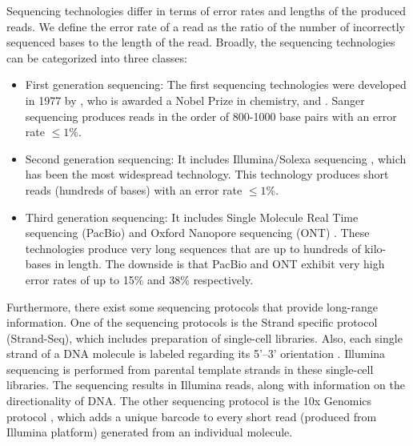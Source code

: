 Sequencing technologies differ in terms of error rates and lengths of the produced reads. We define the error rate of a read as the ratio of the number of incorrectly sequenced bases to the length of the read.
Broadly, the sequencing technologies can be categorized into three classes:
\begin{itemize}
\item First generation sequencing: The first sequencing technologies were developed in 1977 by \cite{sanger1977dna}, who is awarded a Nobel Prize in chemistry, and \cite{maxam1977new}.
Sanger sequencing produces reads in the order of 800-1000 base pairs with an error rate $\le 1$\%.
 \item Second generation sequencing: It includes Illumina/Solexa sequencing \citep{bentley2008accurate}, which has been the most widespread technology. 
 This technology produces short reads (hundreds of bases) with an error rate $\le 1$\%. 
  \item Third generation sequencing: It includes Single Molecule Real Time sequencing (PacBio) \citep{eid2009real} 
  and Oxford Nanopore sequencing (ONT) \citep{laszlo2014decoding}. These technologies produce very long sequences that are up to hundreds of kilo-bases in length. 
  The downside is that PacBio and ONT exhibit very high error rates of up to 15\% and 38\% respectively. 
\end{itemize}

Furthermore, there exist some sequencing protocols that provide long-range information.
One of the sequencing protocols is the Strand specific protocol (Strand-Seq), which includes preparation of single-cell libraries. 
Also, each single strand of a DNA molecule is labeled regarding its 5'–3' orientation \citep{falconer2012dna}.
Illumina sequencing is performed from parental template strands in these single-cell libraries.
The sequencing results in Illumina reads, along with information on the directionality of DNA. 
The other sequencing protocol is the 10x Genomics protocol \citep{eisenstein2015startups}, which adds a unique barcode to every short read (produced from Illumina platform) generated from an individual molecule.

